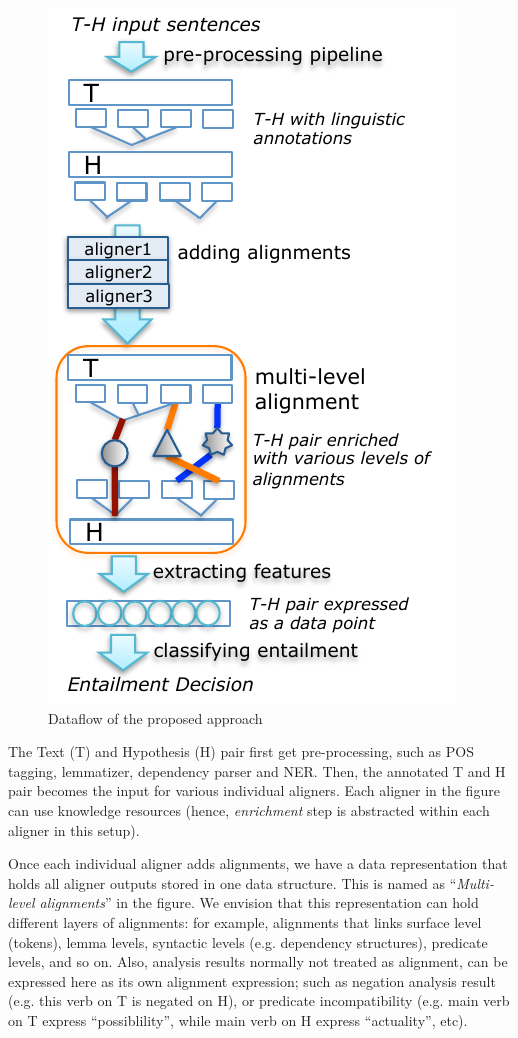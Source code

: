 \documentclass[11pt,letterpaper]{article}
\begin{document}
\begin{figure}[t!b]
  \centering
  \includegraphics[width=0.8\columnwidth]{figures/figure1.pdf}
  \caption{Dataflow of the proposed approach}
  \label{fig:1}
\end{figure}

The Text (T) and Hypothesis (H) pair first get pre-processing, such as
POS tagging, lemmatizer, dependency parser and NER. Then, the 
annotated T and H pair becomes the input for various individual
aligners. Each aligner in the figure can use knowledge resources
(hence, {\em enrichment} step is abstracted within each aligner in
this setup).

Once each individual aligner adds alignments, we have a data
representation that holds all aligner outputs stored in one data
structure. This is named as ``{\em Multi-level alignments}'' in the 
figure. We envision that this representation can hold different layers
of alignments: for example, alignments that links surface level
(tokens), lemma levels, syntactic levels (e.g. dependency structures),
predicate levels, and so on. Also, analysis results normally not
treated as alignment, can be expressed here as its own alignment
expression; such as negation analysis result (e.g. this verb on T is 
negated on H), or predicate incompatibility (e.g. main verb on T
express ``possiblility'', while main verb on H express ``actuality'',
etc).   
\end{document}
